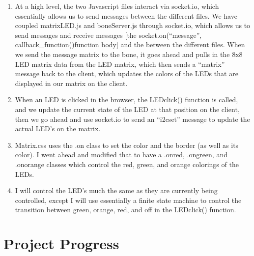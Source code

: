 \documentclass[letterpaper,10pt]{texMemo}
\begin{document}
\begin{enumerate}
 \item At a high level, the two Javascript files interact via socket.io, which
essentially allows us to send messages between the different files. We have
coupled matrixLED.js and boneServer.js through socket.io, which allows us to
send messages and receive messages [the socket.on(``message'',
callback_function(){function body}] and the  between the different files. When
we send the message matrix to the bone, it goes ahead and pulls in the 8x8 LED
matrix data from the LED matrix, which then sends a ``matrix'' message back to
the client, which updates the colors of the LEDs that are displayed in our
matrix on the client.
  \item When an LED is clicked in the browser, the LEDclick() function is
called, and we update the current state of the LED at that position on the
client, then we go ahead and use socket.io to send an ``i2cset'' message to
update the actual LED's on the matrix.
  \item Matrix.css uses the .on class to set the color and the border (as well
as its color). I went ahead and modified that to have a .onred, .ongreen, and
.onorange classes which control the red, green, and orange colorings of the
LEDs.
  \item I will control the LED's much the same as they are currently being
controlled, except I will use essentially a finite state machine to control the
transition between green, orange, red, and off in the LEDclick() function. 
\end{enumerate}


\section{Project Progress}
\noindent 
\end{document}
